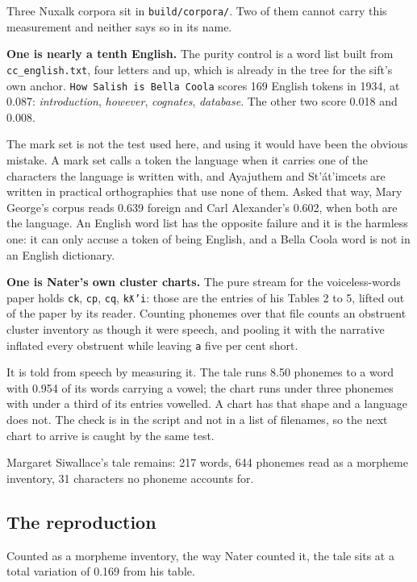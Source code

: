Three Nuxalk corpora sit in \texttt{build/\allowbreak{}corpora/\allowbreak{}}. Two of them cannot
carry this measurement and neither says so in its name.

\textbf{One is nearly a tenth English.} The purity control is a word list built from
\texttt{cc\_\allowbreak{}english.\allowbreak{}txt}, four letters and up, which is already in the tree
for the sift's own anchor. \texttt{How Salish is Bella Coola} scores 169 English tokens in 1934, at
0.087: \emph{introduction}, \emph{however}, \emph{cognates}, \emph{database}. The other two score
0.018 and 0.008.

The mark set is not the test used here, and using it would have been the obvious mistake. A mark set
calls a token the language when it carries one of the characters the language is written with, and
Ayajuthem and St'át'imcets are written in practical orthographies that use none of them. Asked that
way, Mary George's corpus reads 0.639 foreign and Carl Alexander's 0.602, when both are the
language. An English word list has the opposite failure and it is the harmless one: it can only
accuse a token of being English, and a Bella Coola word is not in an English dictionary.

\textbf{One is Nater's own cluster charts.} The pure stream for the voiceless-words paper holds
\texttt{ck}, \texttt{cp}, \texttt{cq}, \texttt{kƛ'i}: those are the entries of his Tables 2 to 5,
lifted out of the paper by its reader. Counting phonemes over that file counts an obstruent cluster
inventory as though it were speech, and pooling it with the narrative inflated every obstruent while
leaving \texttt{a} five per cent short.

It is told from speech by measuring it. The tale runs 8.50 phonemes to a word with 0.954 of its
words carrying a vowel; the chart runs under three phonemes with under a third of its entries
vowelled. A chart has that shape and a language does not. The check is in the script and not
in a list of filenames, so the next chart to arrive is caught by the same test.

Margaret Siwallace's tale remains: 217 words, 644 phonemes read as a morpheme inventory,
31 characters no phoneme accounts for.

\subsection{The reproduction}

Counted as a morpheme inventory, the way Nater counted it, the tale sits at a total variation of
0.169 from his table.

